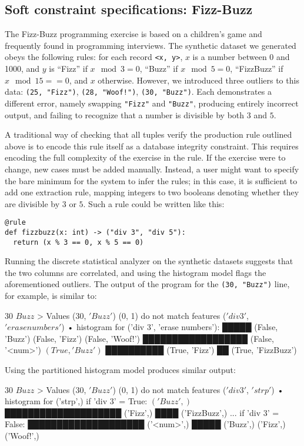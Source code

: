 \subsection{Soft constraint specifications: Fizz-Buzz}
The Fizz-Buzz programming exercise is based on a children's game and frequently found in programming interviews. The synthetic dataset we generated obeys the following rules: for each record \texttt{<x, y>}, $x$ is a number between 0 and 1000, and $y$ is ``Fizz'' if \(x \mod 3 = 0\), ``Buzz'' if \(x \mod 5 = 0\), ``FizzBuzz'' if \(x \mod 15 == 0\), and \(x\) otherwise. However, we introduced three outliers to this data: \texttt{(25, "Fizz")}, \texttt{(28, "Woof!")}, \texttt{(30, "Buzz")}. Each demonstrates a different error, namely swapping \texttt{"Fizz"} and \texttt{"Buzz"}, producing entirely incorrect output, and failing to recognize that a number is divisible by both $3$ and $5$.

A traditional way of checking that all tuples verify the production rule outlined above is to encode this rule itself as a database integrity constraint. This requires encoding the full complexity of the exercise in the rule. If the exercise were to change, new cases must be added manually. Instead, a user might want to specify the bare minimum for the system to infer the rules; in this case, it is sufficient to add one extraction rule, mapping integers to two booleans denoting whether they are divisible by $3$ or $5$. Such a rule could be written like this:

\begin{verbatim}
@rule
def fizzbuzz(x: int) -> ("div 3", "div 5"):
  return (x % 3 == 0, x % 5 == 0)
\end{verbatim}

Running the discrete statistical analyzer on the synthetic datasets suggests that the two columns are correlated, and using the histogram model flags the aforementioned outliers. The output of the program for the \texttt{(30, "Buzz")} line, for example, is similar to:

\begin{lstnobreak}[gobble=2]
   $30$ $Buzz$
   > Values ($30$, $'Buzz'$) (0, 1) do not match
     features ($'div 3'$, $'erase numbers'$)
     • histogram for ('div 3', 'erase numbers'):
       █████ (False, 'Buzz')
       (False, 'Fizz')
       (False, 'Woof!')
       ██████████████████ (False, '<num>')
       $(True, 'Buzz')$
       ██████████ (True, 'Fizz')
       ██ (True, 'FizzBuzz')
\end{lstnobreak}

Using the partitioned histogram model produces similar output:

\begin{lstnobreak}[gobble=2]
   $30$ $Buzz$
   > Values ($30$, $'Buzz'$) (0, 1) do not match
     features ($'div 3'$, $'strp'$)
     • histogram for ('strp',) if 'div 3' = True:
       $('Buzz',)$
       ████████████████████ ('Fizz',)
       ████ ('FizzBuzz',)
     ... if 'div 3' = False:
       ████████████████████ ('<num>',)
       █████ ('Buzz',)
       ('Fizz',)
       ('Woof!',)
\end{lstnobreak}
